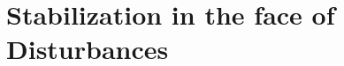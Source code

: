 \documentclass[a4paper,10pt,twoside]{article}
\begin{document}






  \section{Stabilization in the face of Disturbances}
    \label{sec:stabilization_with_disturbance}

    
    
    
    
    \cleardoublepage



\end{document}
